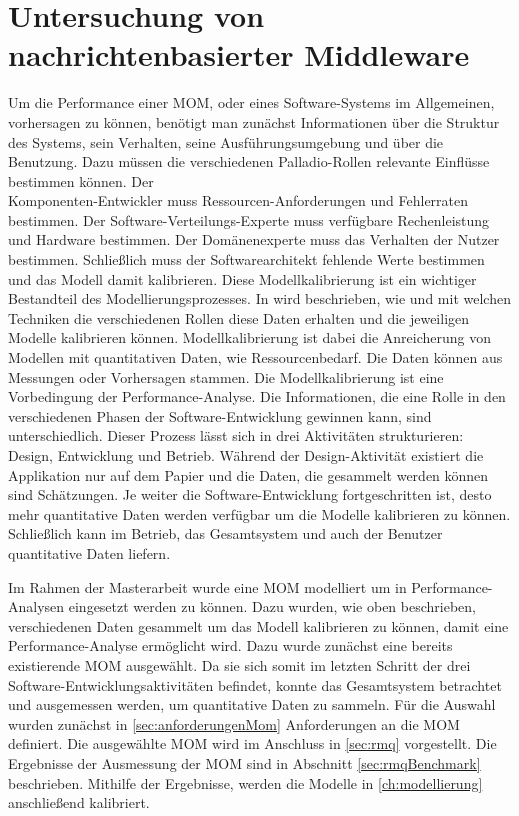 

\chapter{Untersuchung von nachrichtenbasierter Middleware}
\label{ch:mom}
Um die Performance einer MOM, oder eines Software-Systems im Allgemeinen, vorhersagen zu können, benötigt man zunächst Informationen über die Struktur des Systems, sein Verhalten, seine Ausführungsumgebung und über die Benutzung. Dazu müssen die verschiedenen Palladio-Rollen relevante Einflüsse bestimmen können. Der \\ Komponenten-Entwickler muss Ressourcen-Anforderungen und Fehlerraten bestimmen. Der Software-Verteilungs-Experte muss verfügbare Rechenleistung und Hardware bestimmen. Der Domänenexperte muss das Verhalten der Nutzer bestimmen. Schließlich muss der Softwarearchitekt fehlende Werte bestimmen und das Modell damit kalibrieren. Diese Modellkalibrierung ist ein wichtiger Bestandteil des Modellierungsprozesses. In \cite{palladio17} wird beschrieben, wie und mit welchen Techniken die verschiedenen Rollen diese Daten erhalten und die jeweiligen Modelle kalibrieren können. Modellkalibrierung ist dabei die Anreicherung von Modellen mit quantitativen Daten, wie Ressourcenbedarf. Die Daten können aus Messungen oder Vorhersagen stammen. Die Modellkalibrierung ist eine Vorbedingung der Performance-Analyse. Die Informationen, die eine Rolle in den verschiedenen Phasen der Software-Entwicklung gewinnen kann, sind unterschiedlich. Dieser Prozess lässt sich in drei Aktivitäten strukturieren: Design, Entwicklung und Betrieb. Während der Design-Aktivität existiert die Applikation nur auf dem Papier und die Daten, die gesammelt werden können sind Schätzungen. Je weiter die Software-Entwicklung fortgeschritten ist, desto mehr quantitative Daten werden verfügbar um die Modelle kalibrieren zu können. Schließlich kann im Betrieb, das Gesamtsystem und auch der Benutzer quantitative Daten liefern. 

Im Rahmen der Masterarbeit wurde eine MOM modelliert um in Performance-Ana\-ly\-sen eingesetzt werden zu können. Dazu wurden, wie oben beschrieben, verschiedenen Daten gesammelt um das Modell kalibrieren zu können, damit eine Performance-Analyse ermöglicht wird. Dazu wurde zunächst eine bereits existierende MOM ausgewählt. Da sie sich somit im letzten Schritt der drei Software-Entwicklungsaktivitäten befindet, konnte das Gesamtsystem betrachtet und ausgemessen werden, um quantitative Daten zu sammeln. Für die Auswahl wurden zunächst in \autoref{sec:anforderungenMom} Anforderungen an die MOM definiert. Die ausgewählte MOM wird im Anschluss in \autoref{sec:rmq} vorgestellt. Die Ergebnisse der Ausmessung der MOM sind in Abschnitt \ref{sec:rmqBenchmark} beschrieben. Mithilfe der Ergebnisse, werden die Modelle in \autoref{ch:modellierung} anschließend kalibriert.


